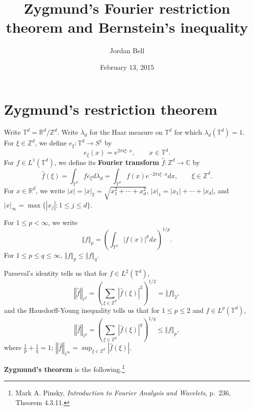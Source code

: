 \documentclass{article}
\newcommand{\norm}[1]{\left\Vert #1 \right\Vert}
\theoremstyle{definition}
\begin{document}
\title{Zygmund's Fourier restriction theorem and Bernstein's inequality}
\author{Jordan Bell}
\date{February 13, 2015}

\maketitle

\section{Zygmund's restriction theorem}
Write $\mathbb{T}^d = \mathbb{R}^d / \mathbb{Z}^d$.
Write $\lambda_d$ for  the Haar measure on $\mathbb{T}^d$ for which $\lambda_d(\mathbb{T}^d)=1$. 
For $\xi \in \mathbb{Z}^d$, we define $e_\xi:\mathbb{T}^d \to S^1$ by
\[
e_\xi(x) = e^{2\pi i\xi\cdot x}, \qquad x \in \mathbb{T}^d.
\]
For
$f \in L^1(\mathbb{T}^d)$, we define its \textbf{Fourier transform} $\hat{f}:\mathbb{Z}^d \to \mathbb{C}$
by
\[
\hat{f}(\xi) =\int_{\mathbb{T}^d} f \overline{e_\xi} d\lambda_d=  \int_{\mathbb{T}^d} f(x) e^{-2\pi i\xi\cdot x} dx, \qquad \xi\in\mathbb{Z}^d.
\]
For $x \in \mathbb{R}^d$, we write $|x|=|x|_2=\sqrt{x_1^2+\cdots+x_d^2}$,
$|x|_1 = |x_1|+\cdots+|x_d|$, and
$|x|_\infty=\max \{|x_j|: 1 \leq j \leq d\}$.



For $1 \leq p < \infty$, we write
\[
\norm{f}_p  = \left( \int_{\mathbb{T}^d} |f(x)|^p dx \right)^{1/p}.
\]
For $1 \leq p \leq q \leq \infty$, $\norm{f}_p \leq \norm{f}_q$.

Parseval's identity tells us that for $f \in L^2(\mathbb{T}^d)$,
\[
\norm{\hat{f}}_{\ell^2} = \left( \sum_{\xi \in \mathbb{Z}^d} |\hat{f}(\xi)|^2 \right)^{1/2} = \norm{f}_2,
\]
and the Hausdorff-Young inequality tells us that for $1 \leq p \leq 2$ and $f \in L^p(\mathbb{T}^d)$, 
\[
\norm{\hat{f}}_{\ell^q} = \left( \sum_{\xi \in \mathbb{Z}^d} |\hat{f}(\xi)|^q \right)^{1/q} \leq 
\norm{f}_p,
\]
where $\frac{1}{p}+\frac{1}{q}=1$; $\norm{\hat{f}}_{\ell^\infty}=\sup_{\xi \in \mathbb{Z}^d} |\hat{f}(\xi)|$.


\textbf{Zygmund's theorem} is the following.\footnote{Mark A. Pinsky, {\em Introduction to Fourier Analysis and Wavelets}, p.~236, Theorem 4.3.11.}
\end{document}
